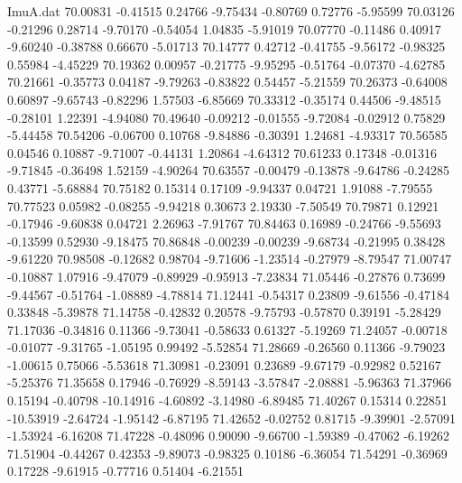 \begin{filecontents}{ImuA.dat}
  70.00831   -0.41515    0.24766   -9.75434   -0.80769    0.72776   -5.95599
  70.03126   -0.21296    0.28714   -9.70170   -0.54054    1.04835   -5.91019
  70.07770   -0.11486    0.40917   -9.60240   -0.38788    0.66670   -5.01713
  70.14777    0.42712   -0.41755   -9.56172   -0.98325    0.55984   -4.45229
  70.19362    0.00957   -0.21775   -9.95295   -0.51764   -0.07370   -4.62785
  70.21661   -0.35773    0.04187   -9.79263   -0.83822    0.54457   -5.21559
  70.26373   -0.64008    0.60897   -9.65743   -0.82296    1.57503   -6.85669
  70.33312   -0.35174    0.44506   -9.48515   -0.28101    1.22391   -4.94080
  70.49640   -0.09212   -0.01555   -9.72084   -0.02912    0.75829   -5.44458
  70.54206   -0.06700    0.10768   -9.84886   -0.30391    1.24681   -4.93317
  70.56585    0.04546    0.10887   -9.71007   -0.44131    1.20864   -4.64312
  70.61233    0.17348   -0.01316   -9.71845   -0.36498    1.52159   -4.90264
  70.63557   -0.00479   -0.13878   -9.64786   -0.24285    0.43771   -5.68884
  70.75182    0.15314    0.17109   -9.94337    0.04721    1.91088   -7.79555
  70.77523    0.05982   -0.08255   -9.94218    0.30673    2.19330   -7.50549
  70.79871    0.12921   -0.17946   -9.60838    0.04721    2.26963   -7.91767
  70.84463    0.16989   -0.24766   -9.55693   -0.13599    0.52930   -9.18475
  70.86848   -0.00239   -0.00239   -9.68734   -0.21995    0.38428   -9.61220
  70.98508   -0.12682    0.98704   -9.71606   -1.23514   -0.27979   -8.79547
  71.00747   -0.10887    1.07916   -9.47079   -0.89929   -0.95913   -7.23834
  71.05446   -0.27876    0.73699   -9.44567   -0.51764   -1.08889   -4.78814
  71.12441   -0.54317    0.23809   -9.61556   -0.47184    0.33848   -5.39878
  71.14758   -0.42832    0.20578   -9.75793   -0.57870    0.39191   -5.28429
  71.17036   -0.34816    0.11366   -9.73041   -0.58633    0.61327   -5.19269
  71.24057   -0.00718   -0.01077   -9.31765   -1.05195    0.99492   -5.52854
  71.28669   -0.26560    0.11366   -9.79023   -1.00615    0.75066   -5.53618
  71.30981   -0.23091    0.23689   -9.67179   -0.92982    0.52167   -5.25376
  71.35658    0.17946   -0.76929   -8.59143   -3.57847   -2.08881   -5.96363
  71.37966    0.15194   -0.40798  -10.14916   -4.60892   -3.14980   -6.89485
  71.40267    0.15314    0.22851  -10.53919   -2.64724   -1.95142   -6.87195
  71.42652   -0.02752    0.81715   -9.39901   -2.57091   -1.53924   -6.16208
  71.47228   -0.48096    0.90090   -9.66700   -1.59389   -0.47062   -6.19262
  71.51904   -0.44267    0.42353   -9.89073   -0.98325    0.10186   -6.36054
  71.54291   -0.36969    0.17228   -9.61915   -0.77716    0.51404   -6.21551

\end{filecontents}
